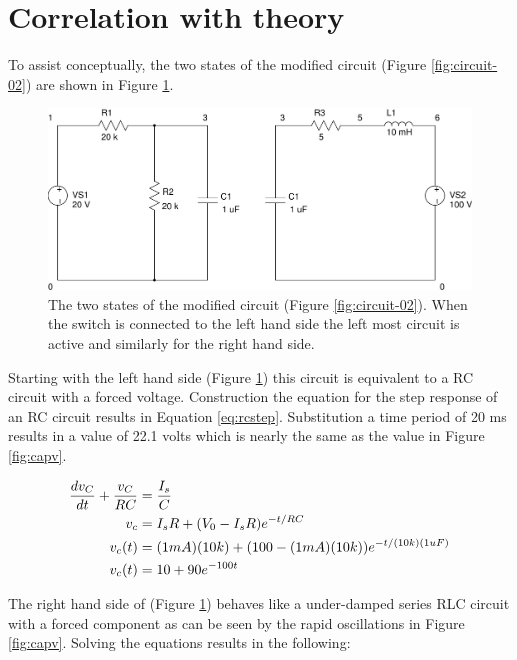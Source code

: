 \documentclass{article}
\begin{document}
\clearpage


\section{Correlation with theory}

To assist conceptually, the two states of the modified circuit
(Figure \ref{fig:circuit-02}) are shown in Figure \ref{fig:circuit-03}.

\begin{figure}
\center
\includegraphics[scale=0.5]{spice/circuit-03}
\caption{The two states of the modified circuit (Figure \ref{fig:circuit-02}).
When the switch is connected to the left hand side the left most circuit
is active and similarly for the right hand side.
}
\label{fig:circuit-03}
\end{figure}

Starting with the left hand side (Figure \ref{fig:circuit-03}) this
circuit is equivalent to a RC circuit with a forced voltage.
Construction the equation for the step response of an RC circuit
results in Equation \ref{eq:rcstep}.
Substitution a time period of 20 ms results in a value of 22.1 volts
which is nearly the same as the value in Figure \ref{fig:capv}.

\begin{align}
	\frac{dv_C}{dt} + \frac{v_C}{R C} &= \frac{I_s}{C} \notag \\
	v_c &= I_s R + (V_0 - I_s R) e^{-t / RC} \notag \\
	v_c(t) &= (1 mA) (10k) + (100 - (1 mA) (10k)) e^{-t / (10k) (1 uF)} \notag \\
	v_c(t) &= 10 + 90 e^{-100 t} \label{eq:rcstep}
\end{align}


The right hand side of (Figure \ref{fig:circuit-03}) behaves like a
under-damped series RLC circuit with a forced component as can be seen by the rapid
oscillations in Figure \ref{fig:capv}.
Solving the equations results in the following:
\end{document}

